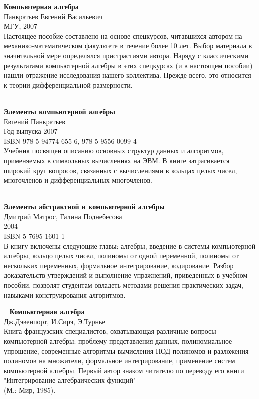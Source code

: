 \begin{thebibliography}{99}

\href{https://drive.google.com/file/d/0B0u4WeMjO894bGQ1SC1PYnBGUG8/view?usp=sharing}{\textbf{Компьютерная алгебра}}\\
Панкратьев Евгений Васильевич\\
МГУ, 2007\\
Настоящее пособие составлено на основе спецкурсов, читавшихся автором на
механико-математическом факультете в течение более 10 лет. Выбор материала в
значительной мере определялся пристрастиями автора. Наряду с классическими
результатами компьютерной алгебры в этих спецкурсах (и в настоящем пособии)
нашли отражение исследования нашего коллектива. Прежде всего, это относится к
теории дифференциальной размерности.

\ \\
\textbf{Элементы компьютерной алгебры}\\
Евгений Панкратьев\\
Год выпуска	2007\\
ISBN	978-5-94774-655-6, 978-5-9556-0099-4\\
Учебник посвящен описанию основных структур данных и алгоритмов, применяемых в
символьных вычислениях на ЭВМ. В книге затрагивается широкий круг вопросов,
связанных с вычислениями в кольцах целых чисел, многочленов и дифференциальных
многочленов.

\ \\
\textbf{Элементы абстрактной и компьютерной алгебры}\\
Дмитрий Матрос, Галина Поднебесова\\
2004\\
ISBN	5-7695-1601-1\\
В книгу включены следующие главы: алгебры, введение в системы компьютерной
алгебры, кольцо целых чисел, полиномы от одной переменной, полиномы от
нескольких переменных, формальное интегрирование, кодирование. Разбор
доказательств утверждений и выполнение упражнений, приведенных в учебном
пособии, позволят студентам овладеть методами решения практических задач,
навыками конструирования алгоритмов.

\ 
\textbf{Компьютерная алгебра}\\
Дж.Дэвенпорт, И.Сирэ, Э.Турнье\\
Книга французских специалистов, охватывающая различные вопросы компьютерной
алгебры: проблему представления данных, полиномиальное упрощение, современные
алгоритмы вычисления НОД полиномов и разложения полиномов на множители,
формальное интегрирование, применение систем компьютерной алгебры. Первый автор
знаком читателю по переводу его книги "Интегрирование алгебраических функций"\\
(М.: Мир, 1985).


\end{thebibliography}
